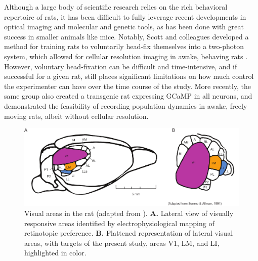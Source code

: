 Although a large body of scientific research relies on the rich behavioral repertoire of rats, it has been difficult to fully leverage recent developments in optical imaging and molecular and genetic tools, as has been done with great success in smaller animals like mice. Notably, Scott and colleagues developed a method for training rats to voluntarily head-fix themselves into a two-photon system, which allowed for cellular resolution imaging in awake, behaving rats \cite{Scott2013}. However, voluntary head-fixation can be difficult and time-intensive, and if successful for a given rat, still places significant limitations on how much control the experimenter can have over the time course of the study. More recently, the same group also created a transgenic rat expressing GCaMP in all neurons, and demonstrated the feasibility of recording population dynamics in awake, freely moving rats, albeit without cellular resolution\cite{Scott2018}. 

\begin{figure}[t!]
    \includegraphics[width=\textwidth]{figures/chapter_2/fig_2-1_rat_visual_areas/fig_2-1_rat_visual_areas.pdf}
    \vspace{.1in}
    \caption[Visual areas in the rat]{Visual areas in the rat (adapted from \cite{Sereno1991}). 
    \textbf{A.} Lateral view of visually responsive areas identified by electrophysiological mapping of retinotopic preference. 
    \textbf{B.} Flattened representation of lateral visual areas, with targets of the present study, areas V1, LM, and LI, highlighted in color. 
    \label{fig:rat_visual_areas}}
\end{figure}


